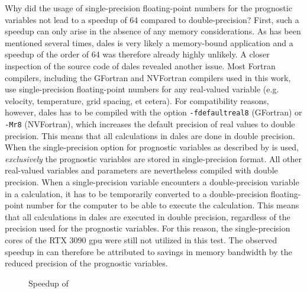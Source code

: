 Why did the usage of single-precision floating-point numbers for the prognostic variables not lead to a speedup of 64 compared to double-precision? First, such a speedup can only arise in the absence of any memory considerations. As has been mentioned several times, \acrshort{dales} is very likely a memory-bound application and a speedup of the order of 64 was therefore already highly unlikely. A closer inspection of the source code of \acrshort{dales} revealed another issue. Most Fortran compilers, including the GFortran and NVFortran compilers used in this work, use single-precision floating-point numbers for any real-valued variable (e.g. velocity, temperature, grid spacing, et cetera). For compatibility reasons, however, \acrshort{dales} has to be compiled with the option \texttt{-fdefaultreal8} (GFortran) or \texttt{-Mr8} (NVFortran), which increases the default precision of real values to double precision. This means that all calculations in \acrshort{dales} are done in double precision. When the single-precision option for prognostic variables as described by \citet{janssonCloudBotanyShallow2023} is used, \emph{exclusively} the prognostic variables are stored in single-precision format. All other real-valued variables and parameters are nevertheless compiled with double precision. When a single-precision variable encounters a double-precision variable in a calculation, it has to be temporarily converted to a double-precision floating-point number for the computer to be able to execute the calculation. This means that all calculations in \acrshort{dales} are executed in double precision, regardless of the precision used for the prognostic variables. For this reason, the single-precision cores of the RTX 3090 \acrshort{gpu} were still not utilized in this test. The observed speedup in  can therefore be attributed to savings in memory bandwidth by the reduced precision of the prognostic variables.

\begin{figure}[h!]
    \centering
    
    \caption{Speedup of }
    \label{fig:single_vs_double_precision}
\end{figure}
